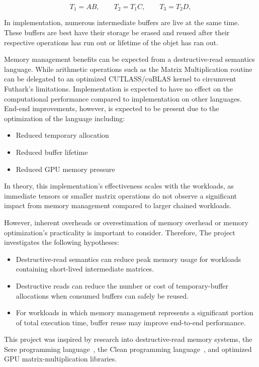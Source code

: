 \documentclass[a4paper]{article}
\begin{document}
\begin{equation}
T_1 = A B,\qquad
T_2 = T_1 C,\qquad
T_3 = T_2 D,
\end{equation}

In implementation, numerous intermediate buffers are live at the same time. These buffers are best have their storage be erased and reused after their respective operations has run out or lifetime of the objet has ran out.

Memory management benefits can be expected from a destructive-read semantics language. While arithmetic operations such as the Matrix Multiplication routine can be delegated to an optimized CUTLASS/cuBLAS kernel to circumvent \cite{futhark} Futhark's limitations. Implementation is expected to have no effect on the computational performance compared to implementation on other languages. End-end improvements, however, is expected to be present due to the optimization of the language including:
\begin{itemize} 
	\item Reduced temporary allocation
	\item Reduced buffer lifetime
	\item Reduced GPU memory pressure
\end{itemize}
In theory, this implementation's effectiveness scales with the workloads, as immediate tensors or smaller matrix operations do not observe a significant impact from memory management compared to larger chained workloads.

However, inherent overheads or overestimation of memory overhead or memory optimization's practicality is important to consider. Therefore, The project investigates the following hypotheses:

\begin{itemize}
\item Destructive-read semantics can reduce peak memory usage for workloads containing short-lived intermediate matrices.
\item Destructive reads can reduce the number or cost of temporary-buffer allocations when consumed buffers can safely be reused.
\item For workloads in which memory management represents a significant portion of total execution time, buffer reuse may improve end-to-end performance.
\end{itemize}

This project was inspired by research into destructive-read memory systems, the Sere programming language~\cite{sere}, the Clean programming language~\cite{clean}, and optimized GPU matrix-multiplication libraries.
\end{document}
